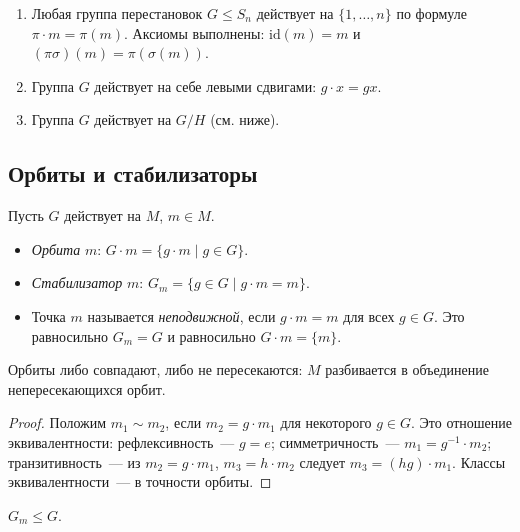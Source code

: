 \documentclass[12pt]{article}
\begin{document}
	\begin{example}
		\begin{enumerate}
			\item Любая группа перестановок $G \leqslant S_n$ действует на $\{1, \dots, n\}$ по формуле $\pi \cdot m = \pi(m)$. Аксиомы выполнены: $\mathrm{id}(m) = m$ и $(\pi\sigma)(m) = \pi(\sigma(m))$.
			\item Группа $G$ действует на себе левыми сдвигами: $g \cdot x = gx$.
			\item Группа $G$ действует на $G/H$ (см. ниже).
		\end{enumerate}
	\end{example}

	\subsection{Орбиты и стабилизаторы}

	\begin{definition}\label{def:orbit-stab}
		Пусть $G$ действует на $M$, $m \in M$.
		\begin{itemize}
			\item \emph{Орбита} $m$: $G \cdot m = \{ g \cdot m \mid g \in G \}$.
			\item \emph{Стабилизатор} $m$: $G_m = \{ g \in G \mid g \cdot m = m \}$.
			\item Точка $m$ называется \emph{неподвижной}, если $g \cdot m = m$ для всех $g \in G$. Это равносильно $G_m = G$ и равносильно $G \cdot m = \{ m \}$.
		\end{itemize}
	\end{definition}

	\begin{statement}\label{st:orbits-partition}
		Орбиты либо совпадают, либо не пересекаются: $M$ разбивается в объединение непересекающихся орбит.
	\end{statement}

	\begin{proof}
		Положим $m_1 \sim m_2$, если $m_2 = g \cdot m_1$ для некоторого $g \in G$. Это отношение эквивалентности: рефлексивность~--- $g = e$; симметричность~--- $m_1 = g^{-1} \cdot m_2$; транзитивность~--- из $m_2 = g \cdot m_1$, $m_3 = h \cdot m_2$ следует $m_3 = (hg) \cdot m_1$. Классы эквивалентности~--- в точности орбиты.
	\end{proof}

	\begin{statement}\label{st:stabilizer-subgroup}
		$G_m \leqslant G$.
	\end{statement}
\end{document}
